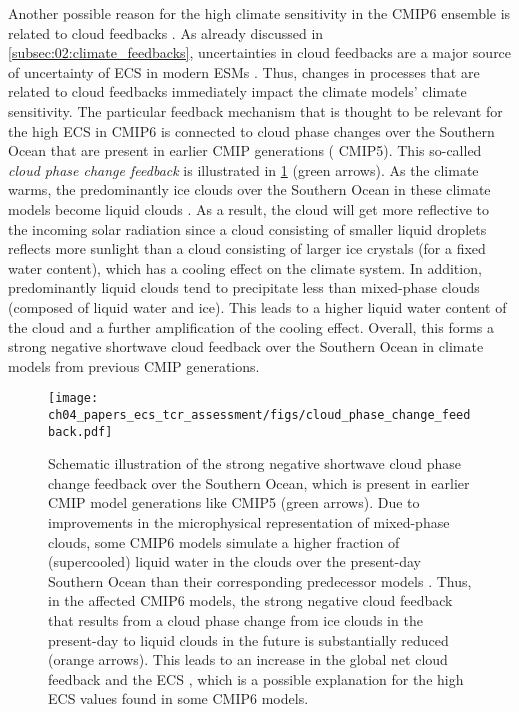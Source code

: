 Another possible reason for the high climate sensitivity in the \acs{CMIP}6
ensemble is related to cloud feedbacks \autocite{Bock2020}. As already
discussed in \cref{subsec:02:climate_feedbacks}, uncertainties in cloud
feedbacks are a major source of uncertainty of \ac{ECS} in modern \acp{ESM}
\autocite{Boucher2013, Flato2013}. Thus, changes in processes that are related
to cloud feedbacks immediately impact the climate models' climate sensitivity.
The particular feedback mechanism that is thought to be relevant for the high
\ac{ECS} in \acs{CMIP}6 is connected to cloud phase changes over the Southern
Ocean that are present in earlier \ac{CMIP} generations (\eg{} \acs{CMIP}5).
This so-called \emph{cloud phase change feedback} is illustrated in
\cref{fig:04:cloud_phase_change_feedback} (green arrows). As the climate warms,
the predominantly ice clouds over the Southern Ocean in these climate models
become liquid clouds \autocite{McCoy2015}. As a result, the cloud will get more
reflective to the incoming solar radiation since a cloud consisting of smaller
liquid droplets reflects more sunlight than a cloud consisting of larger ice
crystals (for a fixed water content), which has a cooling effect on the climate
system. In addition, predominantly liquid clouds tend to precipitate less than
mixed-phase clouds (composed of liquid water and ice). This leads to a higher
liquid water content of the cloud and a further amplification of the cooling
effect. Overall, this forms a strong negative shortwave cloud feedback over the
Southern Ocean in climate models from previous \ac{CMIP} generations.

\begin{figure}[t]
  \centering
  \texttt{[image: 
    ch04\_papers\_ecs\_tcr\_assessment/figs/cloud\_phase\_change\_feedback.pdf]}
  \caption[
    Schematic illustration of the strong negative shortwave cloud phase change
    feedback over the Southern Ocean.
  ]{
    Schematic illustration of the strong negative shortwave cloud phase change
    feedback over the Southern Ocean, which is present in earlier \acs{CMIP}
    model generations like \acs{CMIP}5 (green arrows). Due to improvements in
    the microphysical representation of mixed-phase clouds, some \acs{CMIP}6
    models simulate a higher fraction of (supercooled) liquid water in the
    clouds over the present-day Southern Ocean than their corresponding
    predecessor models \autocite{BodasSalcedo2019, Gettelman2019}. Thus, in the
    affected \acs{CMIP}6 models, the strong negative cloud feedback that
    results from a cloud phase change from ice clouds in the present-day to
    liquid clouds in the future is substantially reduced (orange arrows). This
    leads to an increase in the global net cloud feedback
    \autocite{BodasSalcedo2019, Tan2016} and the \acf{ECS}
    \autocite{Andrews2019, Gettelman2019}, which is a possible explanation for
    the high \acs{ECS} values found in some \acs{CMIP}6 models.
  }
  \label{fig:04:cloud_phase_change_feedback}
\end{figure}

